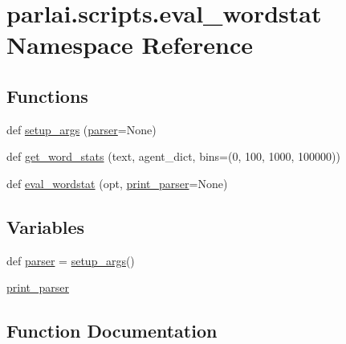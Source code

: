 \hypertarget{namespaceparlai_1_1scripts_1_1eval__wordstat}{}\section{parlai.\+scripts.\+eval\+\_\+wordstat Namespace Reference}
\label{namespaceparlai_1_1scripts_1_1eval__wordstat}
\subsection*{Functions}
\begin{DoxyCompactItemize}
\item 
def \hyperlink{namespaceparlai_1_1scripts_1_1eval__wordstat_af41cd95533433b93e7383bc6dab04963}{setup\+\_\+args} (\hyperlink{namespaceparlai_1_1scripts_1_1eval__wordstat_a78304b921cd79a0fe7c659ed87bad685}{parser}=None)
\item 
def \hyperlink{namespaceparlai_1_1scripts_1_1eval__wordstat_ab2d96b5ac07c988934a0320739fc3c60}{get\+\_\+word\+\_\+stats} (text, agent\+\_\+dict, bins=(0, 100, 1000, 100000))
\item 
def \hyperlink{namespaceparlai_1_1scripts_1_1eval__wordstat_abdad0c3df5ffa1768c0d5822d3668ba0}{eval\+\_\+wordstat} (opt, \hyperlink{namespaceparlai_1_1scripts_1_1eval__wordstat_a3425702146738eb147346873ecda1983}{print\+\_\+parser}=None)
\end{DoxyCompactItemize}
\subsection*{Variables}
\begin{DoxyCompactItemize}
\item 
def \hyperlink{namespaceparlai_1_1scripts_1_1eval__wordstat_a78304b921cd79a0fe7c659ed87bad685}{parser} = \hyperlink{namespaceparlai_1_1scripts_1_1eval__wordstat_af41cd95533433b93e7383bc6dab04963}{setup\+\_\+args}()
\item 
\hyperlink{namespaceparlai_1_1scripts_1_1eval__wordstat_a3425702146738eb147346873ecda1983}{print\+\_\+parser}
\end{DoxyCompactItemize}


\subsection{Function Documentation}
\mbox{\label{namespaceparlai_1_1scripts_1_1eval__wordstat_abdad0c3df5ffa1768c0d5822d3668ba0}} 
